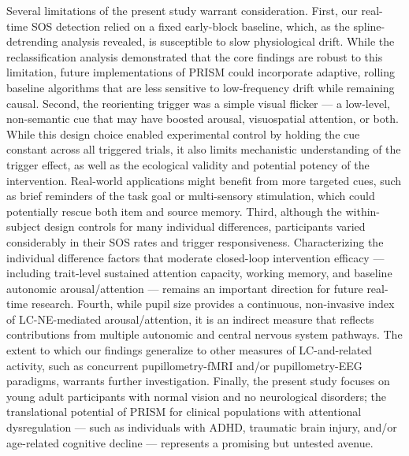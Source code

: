 Several limitations of the present study warrant consideration. First, our real-time SOS detection relied on a fixed early-block baseline, which, as the spline-detrending analysis revealed, is susceptible to slow physiological drift. While the reclassification analysis demonstrated that the core findings are robust to this limitation, future implementations of PRISM could incorporate adaptive, rolling baseline algorithms that are less sensitive to low-frequency drift while remaining causal. Second, the reorienting trigger was a simple visual flicker — a low-level, non-semantic cue that may have boosted arousal, visuospatial attention, or both. While this design choice enabled experimental control by holding the cue constant across all triggered trials, it also limits mechanistic understanding of the trigger effect, as well as the ecological validity and potential potency of the intervention. Real-world applications might benefit from more targeted cues, such as brief reminders of the task goal or multi-sensory stimulation, which could potentially rescue both item and source memory. Third, although the within-subject design controls for many individual differences, participants varied considerably in their SOS rates and trigger responsiveness. Characterizing the individual difference factors that moderate closed-loop intervention efficacy — including trait-level sustained attention capacity, working memory, and baseline autonomic arousal/attention — remains an important direction for future real-time research. Fourth, while pupil size provides a continuous, non-invasive index of LC-NE-mediated arousal/attention, it is an indirect measure that reflects contributions from multiple autonomic and central nervous system pathways. The extent to which our findings generalize to other measures of LC-and-related activity, such as concurrent pupillometry-fMRI and/or pupillometry-EEG paradigms, warrants further investigation. Finally, the present study focuses on young adult participants with normal vision and no neurological disorders; the translational potential of PRISM for clinical populations with attentional dysregulation — such as individuals with ADHD, traumatic brain injury, and/or age-related cognitive decline — represents a promising but untested avenue.

